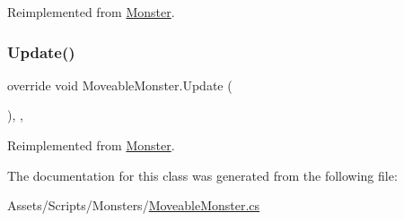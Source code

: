 Reimplemented from \mbox{\hyperlink{class_monster_a79f369a560bdcf5b3dfaf8c9382582d8}{Monster}}.

\mbox{\label{class_moveable_monster_a03035ace68ce00f475ba1ef194ef5595}} 
\subsubsection{\texorpdfstring{Update()}{Update()}}
{\footnotesize\ttfamily override void Moveable\+Monster.\+Update (\begin{DoxyParamCaption}{ }\end{DoxyParamCaption})\hspace{0.3cm}{\ttfamily [inline]}, {\ttfamily [protected]}, {\ttfamily [virtual]}}



Reimplemented from \mbox{\hyperlink{class_monster_a91c04bb8ad53b26283de5f5bab20b789}{Monster}}.



The documentation for this class was generated from the following file\+:\begin{DoxyCompactItemize}
\item 
Assets/\+Scripts/\+Monsters/\mbox{\hyperlink{_moveable_monster_8cs}{Moveable\+Monster.\+cs}}\end{DoxyCompactItemize}
